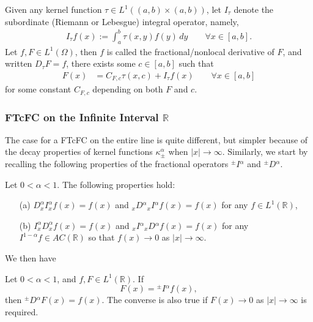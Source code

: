 \documentclass[leqno,final]{siamltex}
\numberwithin{equation}{section}
\newcommand{\Ome}{{\Omega}}
\renewcommand{\(}{\bigl(}
\renewcommand{\)}{\bigr)}
\newcommand{\R}{\mathbb{R}}
\begin{document}
\begin{definition}
Given any kernel function $\tau\in L^1((a,b)\times (a,b))$, let %
$I_\tau$ denote the subordinate (Riemann or Lebesgue) integral operator, namely,
\begin{align}
I_{\tau} f(x):= \int_{a}^b \tau(x,y) f(y)\, dy    \qquad \forall x\in [a,b].
\end{align}
Let $f, F\in L^1(\Ome)$, then $f$ is called the fractional/nonlocal derivative of $F$, and written
$D_{\tau} F = f$, there exists some $c\in [a,b]$ such that 
       \begin{align} \label{general_def_a}
           F(x) &=   C_{F,c} \tau(x,c) +  I_{\tau}  f(x) \qquad \forall x\in [a,b] 
       \end{align}
       for some constant $C_{F,c}$ depending on both $F$ and $c$.
\end{definition}


\subsubsection{\bf FTcFC on the Infinite Interval $\R$}\label{sec-3.1.2}
The case for a FTcFC on the entire line is quite different, but simpler 
because of the decay properties of kernel functions $\kappa^{\alpha}_{\pm}$ when $|x|\to \infty$. Similarly, we start by recalling the following properties 
of the fractional operators ${^{\pm}}{I}{^{\alpha} }$ and ${^{\pm}}{D}{^{\alpha} }$.  

        \begin{lemma} \label{lem3.4}
        	Let $0 < \alpha < 1$. The following properties hold:
        \begin{itemize}
            \item[(a)] $D^{\alpha}_{x} I^{\alpha}_{x} f(x) = f(x)$ and ${_{x}}{D}{^{\alpha}} {_{x}}{I}{^{\alpha}}f(x) = f(x)$ for any $f \in L^{1}(\R)$,
            \item[(b)] $I^{\alpha}_{x} D^{\alpha}_{x} f(x) = f(x)$ and ${_{x}}{I}{^{\alpha}} {_{x}}{D}{^{\alpha}} f(x) =  f(x)$ for any $I^{1-\alpha}f \in AC(\R)$ so that $f(x) \rightarrow 0$ as $|x| \rightarrow \infty$.
        \end{itemize} 
    \end{lemma}
    
    We then have
    
    \begin{theorem}\label{FTFCa}
        Let $0 < \alpha < 1$, and $f, F \in L^{1}(\R)$. If
        \begin{equation}\label{FTFC_1a}
               F(x)= {^{\pm}}{I}{^{\alpha}} f(x),
        \end{equation} 
        then ${^{\pm}}{D}{^{\alpha}} F(x) = f(x)$. The converse is also true if 
        $F(x)\to 0$ as $|x|\to \infty$ is required.
    \end{theorem}
\end{document}
